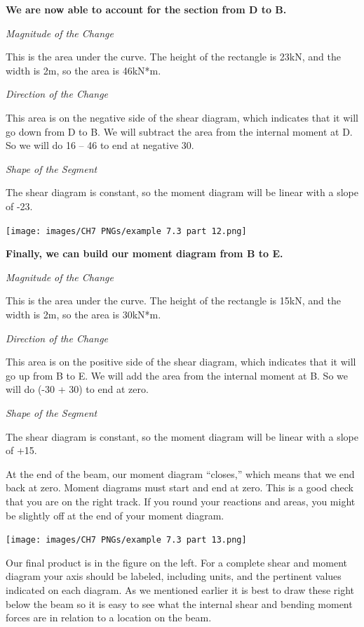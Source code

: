 \documentclass[
  letterpaper,
  DIV=11,
  numbers=noendperiod]{scrreprt}
\begin{document}
\begin{tcolorbox}
\textbf{We are now able to account for the section from D to B.}

\emph{Magnitude of the Change}

This is the area under the curve. The height of the rectangle is 23kN,
and the width is 2m, so the area is 46kN*m.

\emph{Direction of the Change}

This area is on the negative side of the shear diagram, which indicates
that it will go down from D to B. We will subtract the area from the
internal moment at D. So we will do 16 -- 46 to end at negative 30.

\emph{Shape of the Segment}

The shear diagram is constant, so the moment diagram will be linear with
a slope of -23.

\begin{center}
\texttt{[image: images/CH7 PNGs/example 7.3 part 12.png]}
\end{center}

\textbf{Finally, we can build our moment diagram from B to E.}

\emph{Magnitude of the Change}

This is the area under the curve. The height of the rectangle is 15kN,
and the width is 2m, so the area is 30kN*m.

\emph{Direction of the Change}

This area is on the positive side of the shear diagram, which indicates
that it will go up from B to E. We will add the area from the internal
moment at B. So we will do (-30 + 30) to end at zero.

\emph{Shape of the Segment}

The shear diagram is constant, so the moment diagram will be linear with
a slope of +15.

At the end of the beam, our moment diagram ``closes,'' which means that
we end back at zero. Moment diagrams must start and end at zero. This is
a good check that you are on the right track. If you round your
reactions and areas, you might be slightly off at the end of your moment
diagram.

\begin{center}
\texttt{[image: images/CH7 PNGs/example 7.3 part 13.png]}
\end{center}

Our final product is in the figure on the left. For a complete shear and
moment diagram your axis should be labeled, including units, and the
pertinent values indicated on each diagram. As we mentioned earlier it
is best to draw these right below the beam so it is easy to see what the
internal shear and bending moment forces are in relation to a location
on the beam.


\end{tcolorbox}
\end{document}
